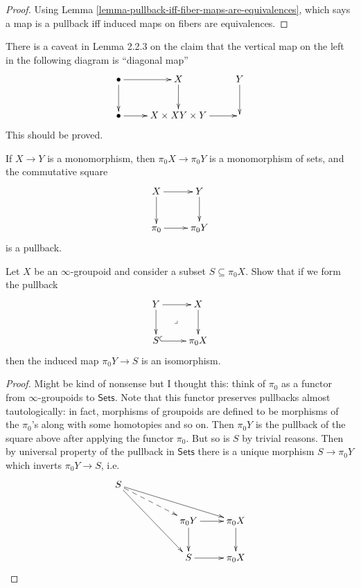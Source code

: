 \begin{proof}
Using Lemma \ref{lemma-pullback-iff-fiber-maps-are-equivalences},
which says a map is a pullback iff induced maps on fibers are equivalences.
\end{proof}

\begin{remark}
\label{remark-lemma-2.2.3}
There is a caveat in Lemma 2.2.3 on the claim
that the vertical map on the left in the following
diagram is ``diagonal map''
$$
\xymatrix{
\bullet\ar[r]\ar[d]&X\ar[d]&Y\ar[d]\\
\bullet\ar[r]&X \times X\ar[r]Y \times Y&
}
$$
This should be proved.
\end{remark}

\begin{proposition}
\label{proposition-monomorphism-then-monomorophism-of-sets-and-pullback-square}
If $X \to Y$ is a monomorphism, then $\pi_0X \to \pi_0Y$ 
is a monomorphism of sets, and the commutative square
$$
\xymatrix{
X\ar[r]\ar[d]&Y\ar[d]\\
\pi_0\ar[r]&\pi_0Y
}
$$
is a pullback.
\end{proposition}

\begin{exercise}
\label{exercise-2.7}
Let $X$ be an $\infty$-groupoid and consider a subset $S\subseteq \pi_0X$.
Show that if we form the pullback
$$
\xymatrix{
Y\ar[r]\ar[d]\ar@{}[dr]|-{\lrcorner}&X\ar[d]\\
S\ar@{^{(}->}[r]&\pi_0X
}
$$
then the induced map $\pi_0Y\to S$ is an isomorphism.
\end{exercise}

\begin{proof}
Might be kind of nonsense but I thought this:
think of $\pi_0$ as a functor from  $\infty$-groupoids
to $\mathsf{Sets}$. Note that this functor
preserves pullbacks almost tautologically:
in fact, morphisms of groupoids are defined
to be morphisms of the $\pi_0$'s along
with some homotopies and so on. Then
$\pi_0Y$ is the pullback of the square above
after applying the functor $\pi_0$.
But so is $S$ by trivial reasons.
Then by universal property of the pullback
in $\mathsf{Sets}$ there is a unique morphism
$S \to \pi_0Y$ which inverts $\pi_0Y \to S$,
i.e.
$$
\xymatrix{
S \ar[rrrd] \ar@{-->}[rrd] \ar[rrdd] & & \\
& & \pi_0Y \ar[d] \ar[r] & \pi_0X \ar[d] \\
& & S \ar[r] & \pi_0X
}
$$
\end{proof}


